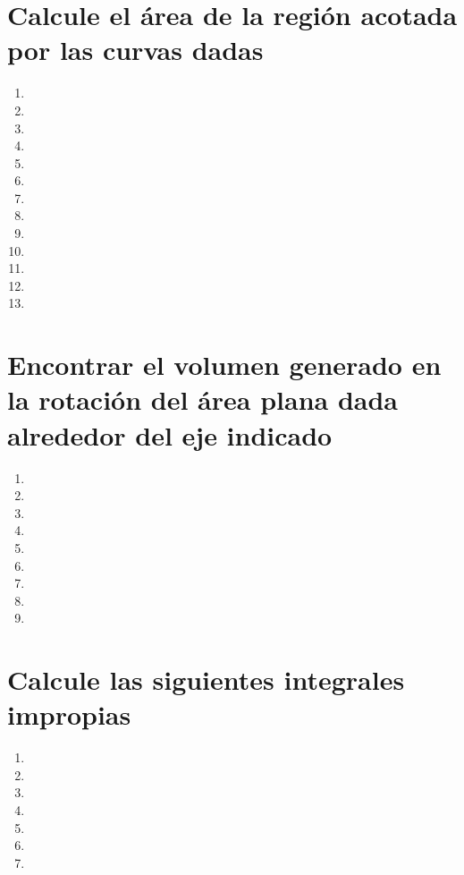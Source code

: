 \documentclass[11pt]{article}
\begin{document}
\section{Calcule el área de la región acotada por las curvas dadas}
\begin{enumerate}[resume,label=\textbf{\arabic*.}]
    \item 
    \item 
    \item 
    \item 
    \item 
    \item 
    \item 
    \item 
    \item 
    \item 
    \item 
    \item 
    \item 
\end{enumerate}

\section{Encontrar el volumen generado en la rotación del área plana dada alrededor del eje indicado}
\begin{enumerate}[resume,label=\textbf{\arabic*.}]
    \item 
    \item 
    \item 
    \item 
    \item 
    \item 
    \item 
    \item 
    \item 
\end{enumerate}

\section{Calcule las siguientes integrales impropias}
\begin{enumerate}[resume,label=\textbf{\arabic*.}]
    \item 
    \item 
    \item 
    \item 
    \item 
    \item 
    \item 
\end{enumerate}
\end{document}
